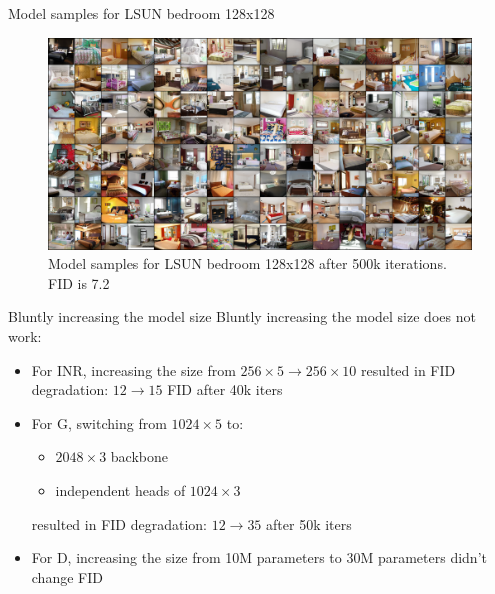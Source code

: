 \documentclass[10pt, handout]{beamer}
\begin{document}
\begin{frame}{Model samples for LSUN bedroom 128x128}
\begin{figure}
    \centering
    \includegraphics[width=\textwidth]{images/best-model-samples-august-30}
    \caption{Model samples for LSUN bedroom 128x128 after 500k iterations. FID is 7.2}
\end{figure}    
\end{frame}


\begin{frame}{Bluntly increasing the model size}
Bluntly increasing the model size does not work:
\begin{itemize}
    \item\pause For INR, increasing the size from $256 \times 5 \to 256 \times 10$ resulted in FID degradation: $12 \to 15$ FID after 40k iters
    \item\pause For G, switching from $1024 \times 5$ to:
    \begin{itemize}
        \item\pause $2048 \times 3$ backbone
        \item{} independent heads of $1024 \times 3$
    \end{itemize}
    resulted in FID degradation: $12 \to 35$ after 50k iters
    \item\pause For D, increasing the size from 10M parameters to 30M parameters didn't change FID
\end{itemize}
\end{frame}
\end{document}
